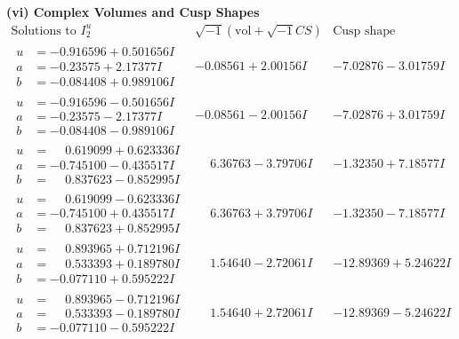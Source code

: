\documentclass[1p]{elsarticle_modified}
\theoremstyle{definition}
\newcommand{\I}{\sqrt{-1}}
\begin{document}
\newpage\flushleft \textbf{(vi) Complex Volumes and Cusp Shapes}
$$\begin{array}{c|c|c}  
\text{Solutions to }I^u_{2}& \I (\text{vol} + \sqrt{-1}CS) & \text{Cusp shape}\\
 \hline 
\begin{aligned}
u &= -0.916596 + 0.501656 I \\
a &= -0.23575 + 2.17377 I \\
b &= -0.084408 + 0.989106 I\end{aligned}
 & -0.08561 + 2.00156 I & -7.02876 - 3.01759 I \\ \hline\begin{aligned}
u &= -0.916596 - 0.501656 I \\
a &= -0.23575 - 2.17377 I \\
b &= -0.084408 - 0.989106 I\end{aligned}
 & -0.08561 - 2.00156 I & -7.02876 + 3.01759 I \\ \hline\begin{aligned}
u &= \phantom{-}0.619099 + 0.623336 I \\
a &= -0.745100 - 0.435517 I \\
b &= \phantom{-}0.837623 - 0.852995 I\end{aligned}
 & \phantom{-}6.36763 - 3.79706 I & -1.32350 + 7.18577 I \\ \hline\begin{aligned}
u &= \phantom{-}0.619099 - 0.623336 I \\
a &= -0.745100 + 0.435517 I \\
b &= \phantom{-}0.837623 + 0.852995 I\end{aligned}
 & \phantom{-}6.36763 + 3.79706 I & -1.32350 - 7.18577 I \\ \hline\begin{aligned}
u &= \phantom{-}0.893965 + 0.712196 I \\
a &= \phantom{-}0.533393 + 0.189780 I \\
b &= -0.077110 + 0.595222 I\end{aligned}
 & \phantom{-}1.54640 - 2.72061 I & -12.89369 + 5.24622 I \\ \hline\begin{aligned}
u &= \phantom{-}0.893965 - 0.712196 I \\
a &= \phantom{-}0.533393 - 0.189780 I \\
b &= -0.077110 - 0.595222 I\end{aligned}
 & \phantom{-}1.54640 + 2.72061 I & -12.89369 - 5.24622 I \\ \hline\begin{aligned}

\end{aligned}
\end{array}$$
\end{document}
